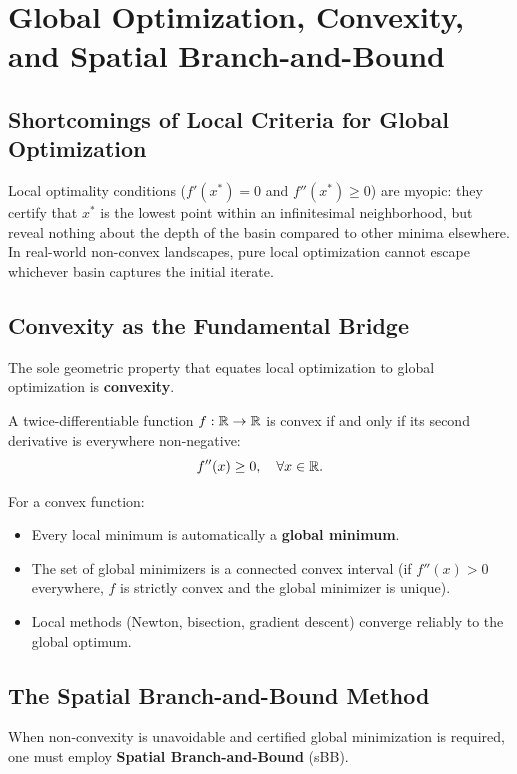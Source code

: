 \FloatBarrier
\section{Global Optimization, Convexity, and Spatial Branch-and-Bound}
\label{sec:univariate-global-branch-and-bound-en}

\subsection{Shortcomings of Local Criteria for Global Optimization}
Local optimality conditions ($f'(x^*) = 0$ and $f''(x^*) \ge 0$) are myopic: they certify that $x^*$ is the lowest point within an infinitesimal neighborhood, but reveal nothing about the depth of the basin compared to other minima elsewhere.
In real-world non-convex landscapes, pure local optimization cannot escape whichever basin captures the initial iterate.

\subsection{Convexity as the Fundamental Bridge}
The sole geometric property that equates local optimization to global optimization is \textbf{convexity}.
\begin{definition}
A twice-differentiable function $f: \mathbb{R} \to \mathbb{R}$ is convex if and only if its second derivative is everywhere non-negative:
\begin{equation}
    f''(x) \ge 0, \quad \forall x \in \mathbb{R}.
\end{equation}
\end{definition}
For a convex function:
\begin{itemize}
    \item Every local minimum is automatically a \textbf{global minimum}.
    \item The set of global minimizers is a connected convex interval (if $f''(x) > 0$ everywhere, $f$ is strictly convex and the global minimizer is unique).
    \item Local methods (Newton, bisection, gradient descent) converge reliably to the global optimum.
\end{itemize}

\subsection{The Spatial Branch-and-Bound Method}
When non-convexity is unavoidable and certified global minimization is required, one must employ \textbf{Spatial Branch-and-Bound} (sBB).

